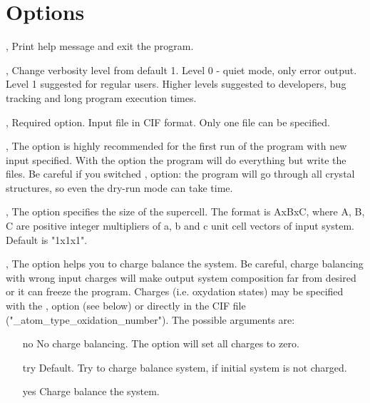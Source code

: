 \documentclass[a4paper,english]{article}
\begin{document}
\section{Options}
\begin{Description}

\item[\Opt{-h}, \Opt{\Dd help}]
      Print help message and exit the program.

\item[\OptArg{-v }{level}, \OptArg{\Dd verbose=}{level}] 
      Change verbosity level from default 1. Level 0 - quiet mode, only error output. Level 1 suggested for regular users. Higher levels suggested to developers, bug tracking and long program execution times. 

\item[\OptArg{-i }{input-file}, \OptArg{\Dd input=}{input-file}]
      Required option. Input file in CIF format. Only one file can be specified.

\item[\Opt{-d}, \Opt{\Dd dry-run}]
      The option is highly recommended for the first run of the program with new input specified. 
      With the option the program will do everything but write the files. Be careful if you switched ,  option: the program will go through all crystal structures, so even the dry-run mode can take time.

\item[\OptArg{-s }{cell-size}, \OptArg{\Dd cell-size=}{cell-size}]
      The option specifies the size of the supercell. The format is AxBxC, where A, B, C are positive integer multipliers of a, b and c unit cell vectors of input system. Default is "1x1x1".

\item[\OptArg{-c }{balance-type}, \OptArg{\Dd charge-balance=}{balance-type}]
      The option helps you to charge balance the system. Be careful, charge balancing with wrong input charges will make output system composition far from desired or it can freeze the program.  Charges (i.e. oxydation states) may be specified with the ,  option (see below) or directly in the CIF file ("\_atom\_type\_oxidation\_number"). The possible arguments are:
      \begin{itemize}
         \item[no]   No charge balancing. The option will set all charges to zero.
         \item[try]  Default. Try to charge balance system, if initial system is not charged.
         \item[yes]  Charge balance the system.
      \end{itemize}


\end{Description}
\end{document}
